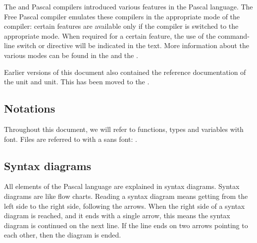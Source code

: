 The \tp and \delphi Pascal compilers introduced various features in the
Pascal language. The Free Pascal compiler emulates these compilers in the
appropriate mode of the compiler: certain features are available only
if the compiler is switched to the appropriate mode. When required for
a certain feature, the use of the  command-line switch or
 directive will be indicated in the text. More information
about the various modes can be found in the \userref and the \progref.

Earlier versions of this document also contained the reference documentation
of the  unit and  unit. This has been moved to the
\unitsref.

\subsection*{Notations}
Throughout this document, we will refer to functions, types and variables
with  font. Files are referred to with a sans font:
.

\subsection*{Syntax diagrams}
All elements of the Pascal language are explained in syntax diagrams.
Syntax diagrams are like flow charts. Reading a syntax diagram means getting
from the left side to the right side, following the arrows.
When the right side of a syntax diagram is reached, and it ends with a single
arrow, this means the syntax diagram is continued on the next line. If
the line ends on two arrows pointing to each other, then the diagram is
ended.

